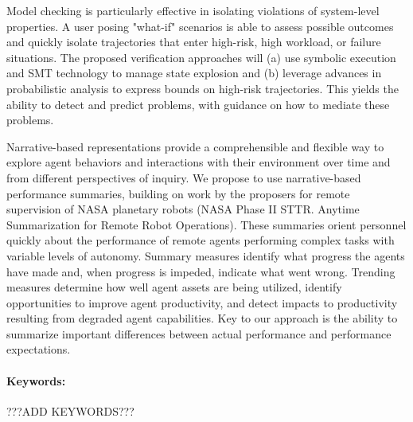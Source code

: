 \documentclass[palatinofont10]{nsfprop}
\begin{document}
Model checking is particularly effective in isolating violations of
system-level properties. A user posing "what-if" scenarios is able to
assess possible outcomes and quickly isolate trajectories that enter
high-risk, high workload, or failure situations. The proposed
verification approaches will (a) use symbolic execution and SMT
technology to manage state explosion and (b) leverage advances in
probabilistic analysis to express bounds on high-risk
trajectories. This yields the ability to detect and predict problems,
with guidance on how to mediate these problems.

Narrative-based representations provide a comprehensible and flexible
way to explore agent behaviors and interactions with their environment
over time and from different perspectives of inquiry. We propose to
use narrative-based performance summaries, building on work by the
proposers for remote supervision of NASA planetary robots (NASA Phase
II STTR. Anytime Summarization for Remote Robot Operations). These
summaries orient personnel quickly about the performance of remote
agents performing complex tasks with variable levels of
autonomy. Summary measures identify what progress the agents have made
and, when progress is impeded, indicate what went wrong. Trending
measures determine how well agent assets are being utilized, identify
opportunities to improve agent productivity, and detect impacts to
productivity resulting from degraded agent capabilities. Key to our
approach is the ability to summarize important differences between
actual performance and performance expectations.
\paragraph{Keywords:\/} ???ADD KEYWORDS???
\end{document}
